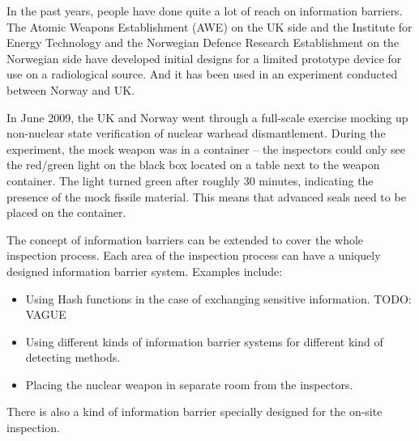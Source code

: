 \documentclass[twoside,titlepage,11pt,twocolumn,a4paper]{article}
\begin{document}

In the past years, people have done quite a lot of reach on
information barriers. The Atomic Weapons Establishment (AWE) on the UK 
side and the Institute for
Energy Technology and the Norwegian Defence Research Establishment on
the Norwegian side have developed initial designs for a limited
prototype device for use on a radiological source. And it has been
used in an experiment conducted between Norway and UK.

In June 2009, the UK and Norway went through a full-scale exercise
mocking up non-nuclear state verification of nuclear warhead
dismantlement.  During the experiment, the mock weapon was in a
container -- the inspectors could only see the red/green light on the
black box located on a table next to the weapon container. The light
turned green after roughly 30 minutes, indicating the presence of the
mock fissile material. This means that advanced seals need to be
placed on the container.

The concept of information barriers can be extended to cover the whole
inspection process. Each area of the inspection process can have a
uniquely designed information barrier system. Examples include:
\begin{itemize}
  \item Using Hash functions in the case of exchanging sensitive
    information. \citep{knuth1976} TODO: VAGUE
  \item Using different kinds of information barrier systems for
    different kind of detecting methods.
  \item Placing the nuclear weapon in separate room from the
    inspectors.
\end{itemize}
There is also a kind of information barrier specially
designed for the on-site inspection.
\end{document}
